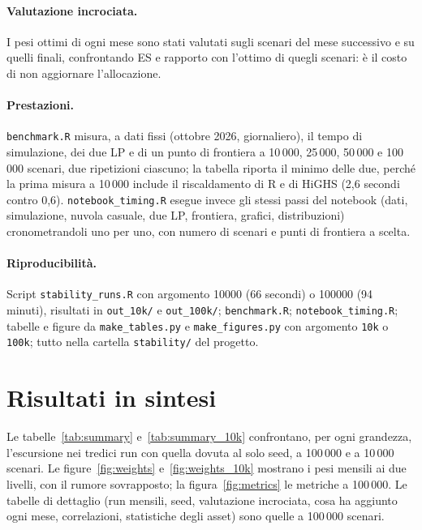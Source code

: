 \documentclass[11pt,a4paper]{article}
\begin{document}
\paragraph{Valutazione incrociata.} I pesi ottimi di ogni mese sono stati valutati sugli scenari del mese successivo e su quelli finali, confrontando ES e rapporto con l'ottimo di quegli scenari: \`e il costo di non aggiornare l'allocazione.

\paragraph{Prestazioni.} \texttt{benchmark.R} misura, a dati fissi (ottobre 2026, giornaliero), il tempo di simulazione, dei due LP e di un punto di frontiera a 10\,000, 25\,000, 50\,000 e 100\,000 scenari, due ripetizioni ciascuno; la tabella riporta il minimo delle due, perch\'e la prima misura a 10\,000 include il riscaldamento di R e di HiGHS (2,6 secondi contro 0,6). \texttt{notebook\_timing.R} esegue invece gli stessi passi del notebook (dati, simulazione, nuvola casuale, due LP, frontiera, grafici, distribuzioni) cronometrandoli uno per uno, con numero di scenari e punti di frontiera a scelta.

\paragraph{Riproducibilit\`a.} Script \texttt{stability\_runs.R} con argomento 10000 (66 secondi) o 100000 (94 minuti), risultati in \texttt{out\_10k/} e \texttt{out\_100k/}; \texttt{benchmark.R}; \texttt{notebook\_timing.R}; tabelle e figure da \texttt{make\_tables.py} e \texttt{make\_figures.py} con argomento \texttt{10k} o \texttt{100k}; tutto nella cartella \texttt{stability/} del progetto.

\section{Risultati in sintesi}

Le tabelle~\ref{tab:summary} e~\ref{tab:summary_10k} confrontano, per ogni grandezza, l'escursione nei tredici run con quella dovuta al solo seed, a 100\,000 e a 10\,000 scenari. Le figure~\ref{fig:weights} e~\ref{fig:weights_10k} mostrano i pesi mensili ai due livelli, con il rumore sovrapposto; la figura~\ref{fig:metrics} le metriche a 100\,000. Le tabelle di dettaglio (run mensili, seed, valutazione incrociata, cosa ha aggiunto ogni mese, correlazioni, statistiche degli asset) sono quelle a 100\,000 scenari.
\end{document}
